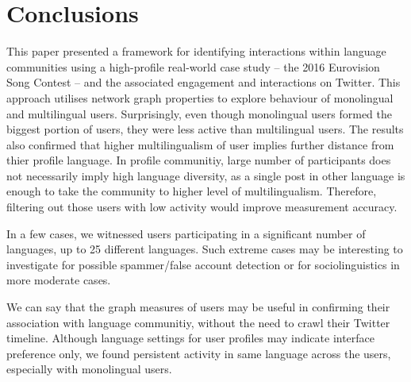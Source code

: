 \documentclass{llncs}
\begin{document}
\section{Conclusions}\label{conclusions}

This paper presented a framework for identifying interactions within
language communities using a high-profile real-world case study --
the 2016 Eurovision Song Contest -- and the associated engagement and
interactions on Twitter. This approach utilises network graph
properties to explore behaviour of monolingual and multilingual 
users. Surprisingly, even though monolingual users formed the biggest
portion of users, they were less active than multilingual users.
The results also confirmed that higher multilingualism of user implies 
further distance from thier profile language.
In profile communitiy, large number of participants does not necessarily 
imply high language diversity, as a single post in other language 
is enough to take the community to higher level of multilingualism.
Therefore, filtering out those users with low activity would improve 
measurement accuracy.

In a few cases, we witnessed users participating in a significant number 
of languages, up to 25 different languages. Such extreme cases may be 
interesting to investigate for possible spammer/false account detection or for
sociolinguistics in more moderate cases. 

We can say that the graph measures of users may be useful in confirming their 
association with language communitiy, without the need to crawl their Twitter timeline. 
Although language settings for user profiles may indicate interface preference only, 
we found persistent activity in same language across the users, especially with 
monolingual users.


\end{document}
